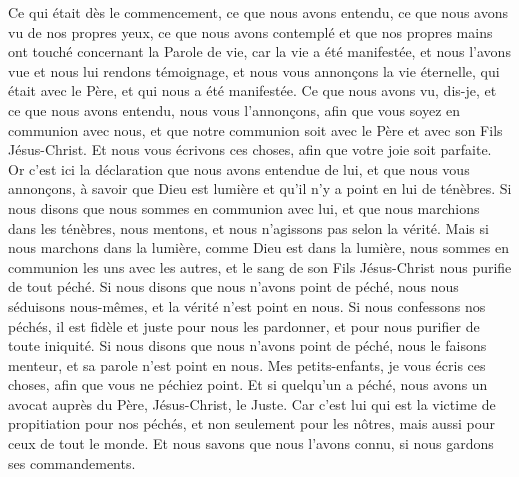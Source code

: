 \begin{multicols}{2}
\VerseOne{}Ce qui était dès le commencement, ce que nous avons entendu, ce que nous avons vu de nos propres yeux, ce que nous avons contemplé et que nos propres mains ont touché concernant la Parole de vie,
car la vie a été manifestée, et nous l'avons vue et nous lui rendons témoignage, et nous vous annonçons la vie éternelle, qui était avec le Père, et qui nous a été manifestée.
Ce que nous avons vu, dis-je, et ce que nous avons entendu, nous vous l'annonçons, afin que vous soyez en communion avec nous, et que notre communion soit avec le Père et avec son Fils Jésus-Christ.
Et nous vous écrivons ces choses, afin que votre joie soit parfaite.
Or c'est ici la déclaration que nous avons entendue de lui, et que nous vous annonçons, à savoir que Dieu est lumière et qu'il n'y a point en lui de ténèbres.
Si nous disons que nous sommes en communion avec lui, et que nous marchions dans les ténèbres, nous mentons, et nous n'agissons pas selon la vérité.
Mais si nous marchons dans la lumière, comme Dieu est dans la lumière, nous sommes en communion les uns avec les autres, et le sang de son Fils Jésus-Christ nous purifie de tout péché.
Si nous disons que nous n'avons point de péché, nous nous séduisons nous-mêmes, et la vérité n'est point en nous.
Si nous confessons nos péchés, il est fidèle et juste pour nous les pardonner, et pour nous purifier de toute iniquité.
Si nous disons que nous n'avons point de péché, nous le faisons menteur, et sa parole n'est point en nous.
\VerseOne{}Mes petits-enfants, je vous écris ces choses, afin que vous ne péchiez point. Et si quelqu'un a péché, nous avons un avocat auprès du Père, Jésus-Christ, le Juste.
Car c'est lui qui est la victime de propitiation pour nos péchés, et non seulement pour les nôtres, mais aussi pour ceux de tout le monde.
Et nous savons que nous l'avons connu, si nous gardons ses commandements.

\end{multicols}
